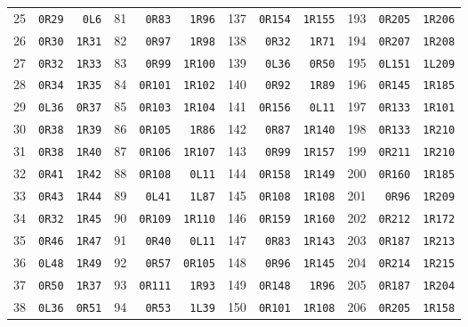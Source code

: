 \begin{center}
\begin{tabular}{rrr@{\hspace{5mm}}rrr@{\hspace{5mm}}rrr@{\hspace{5mm}}rrr}
25 & \texttt{0R29} & \texttt{0L6} & 81 & \texttt{0R83} & \texttt{1R96} & 137 & \texttt{0R154} & \texttt{1R155} & 193 & \texttt{0R205} & \texttt{1R206} \\
26 & \texttt{0R30} & \texttt{1R31} & 82 & \texttt{0R97} & \texttt{1R98} & 138 & \texttt{0R32} & \texttt{1R71} & 194 & \texttt{0R207} & \texttt{1R208} \\
27 & \texttt{0R32} & \texttt{1R33} & 83 & \texttt{0R99} & \texttt{1R100} & 139 & \texttt{0L36} & \texttt{0R50} & 195 & \texttt{0L151} & \texttt{1L209} \\
28 & \texttt{0R34} & \texttt{1R35} & 84 & \texttt{0R101} & \texttt{1R102} & 140 & \texttt{0R92} & \texttt{1R89} & 196 & \texttt{0R145} & \texttt{1R185} \\
29 & \texttt{0L36} & \texttt{0R37} & 85 & \texttt{0R103} & \texttt{1R104} & 141 & \texttt{0R156} & \texttt{0L11} & 197 & \texttt{0R133} & \texttt{1R101} \\
30 & \texttt{0R38} & \texttt{1R39} & 86 & \texttt{0R105} & \texttt{1R86} & 142 & \texttt{0R87} & \texttt{1R140} & 198 & \texttt{0R133} & \texttt{1R210} \\
31 & \texttt{0R38} & \texttt{1R40} & 87 & \texttt{0R106} & \texttt{1R107} & 143 & \texttt{0R99} & \texttt{1R157} & 199 & \texttt{0R211} & \texttt{1R210} \\
32 & \texttt{0R41} & \texttt{1R42} & 88 & \texttt{0R108} & \texttt{0L11} & 144 & \texttt{0R158} & \texttt{1R149} & 200 & \texttt{0R160} & \texttt{1R185} \\
33 & \texttt{0R43} & \texttt{1R44} & 89 & \texttt{0L41} & \texttt{1L87} & 145 & \texttt{0R108} & \texttt{1R108} & 201 & \texttt{0R96} & \texttt{1R209} \\
34 & \texttt{0R32} & \texttt{1R45} & 90 & \texttt{0R109} & \texttt{1R110} & 146 & \texttt{0R159} & \texttt{1R160} & 202 & \texttt{0R212} & \texttt{1R172} \\
35 & \texttt{0R46} & \texttt{1R47} & 91 & \texttt{0R40} & \texttt{0L11} & 147 & \texttt{0R83} & \texttt{1R143} & 203 & \texttt{0R187} & \texttt{1R213} \\
36 & \texttt{0L48} & \texttt{1R49} & 92 & \texttt{0R57} & \texttt{0R105} & 148 & \texttt{0R96} & \texttt{1R145} & 204 & \texttt{0R214} & \texttt{1R215} \\
37 & \texttt{0R50} & \texttt{1R37} & 93 & \texttt{0R111} & \texttt{1R93} & 149 & \texttt{0R148} & \texttt{1R96} & 205 & \texttt{0R187} & \texttt{1R204} \\
38 & \texttt{0L36} & \texttt{0R51} & 94 & \texttt{0R53} & \texttt{1L39} & 150 & \texttt{0R101} & \texttt{1R108} & 206 & \texttt{0R205} & \texttt{1R158} \\

\end{tabular}
\end{center}
